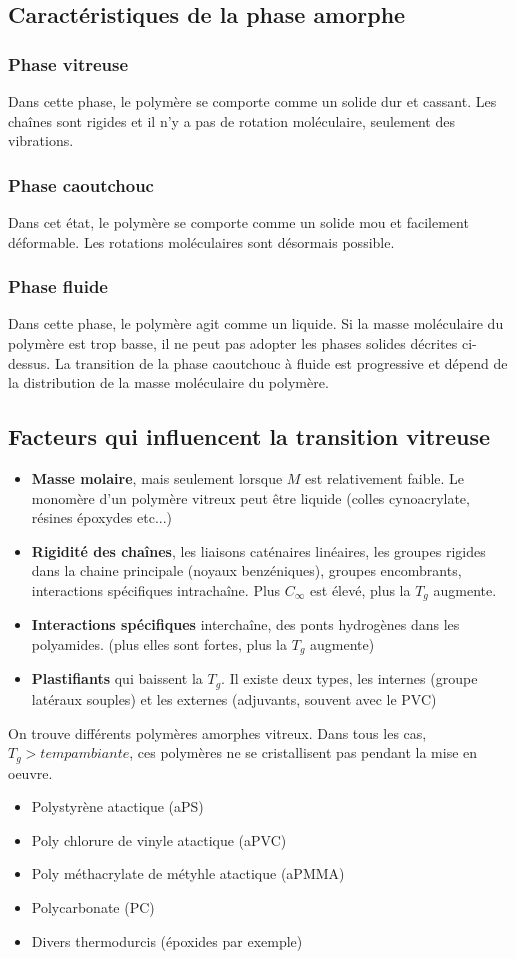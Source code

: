 \documentclass[../main.tex]{subfiles}
\begin{document}
	\subsection{Caractéristiques de la phase amorphe}
	\subsubsection{Phase vitreuse}
	Dans cette phase, le polymère se comporte comme un solide dur et cassant. Les chaînes sont rigides et il n'y a pas de rotation moléculaire, seulement des vibrations.
	\subsubsection{Phase caoutchouc}
	Dans cet état, le polymère se comporte comme un solide mou et facilement déformable. Les rotations moléculaires sont désormais possible.
	\subsubsection{Phase fluide}
	Dans cette phase, le polymère agit comme un liquide. Si la masse moléculaire du polymère est trop basse, il ne peut pas adopter les phases solides décrites ci-dessus. La transition de la phase caoutchouc à fluide est progressive et dépend de la distribution de la masse moléculaire du polymère. 
	\subsection{Facteurs qui influencent la transition vitreuse}
	\begin{itemize}
		\item \textbf{Masse molaire}, mais seulement lorsque $M$ est relativement faible. Le monomère d'un polymère vitreux peut être liquide (colles cynoacrylate, résines époxydes etc...)
		\item \textbf{Rigidité des chaînes}, les liaisons caténaires linéaires, les groupes rigides dans la chaine principale (noyaux benzéniques), groupes encombrants, interactions spécifiques intrachaîne. Plus $C_\infty$ est élevé, plus la $T_g$ augmente.
		\item \textbf{Interactions spécifiques} interchaîne, des ponts hydrogènes dans les polyamides. (plus elles sont fortes, plus la $T_g$ augmente)
		\item \textbf{Plastifiants} qui baissent la $T_g$. Il existe deux types, les internes (groupe latéraux souples) et les externes (adjuvants, souvent avec le PVC)
	\end{itemize}
	On trouve différents polymères amorphes vitreux. Dans tous les cas, $T_g > temp ambiante$, ces polymères ne se cristallisent pas pendant la mise en oeuvre. 
	\begin{itemize}
		\item Polystyrène atactique (aPS)
		\item Poly chlorure de vinyle atactique (aPVC)
		\item Poly méthacrylate de métyhle atactique (aPMMA)
		\item Polycarbonate (PC)
		\item Divers thermodurcis (époxides par exemple)
	\end{itemize}
	
\end{document}
